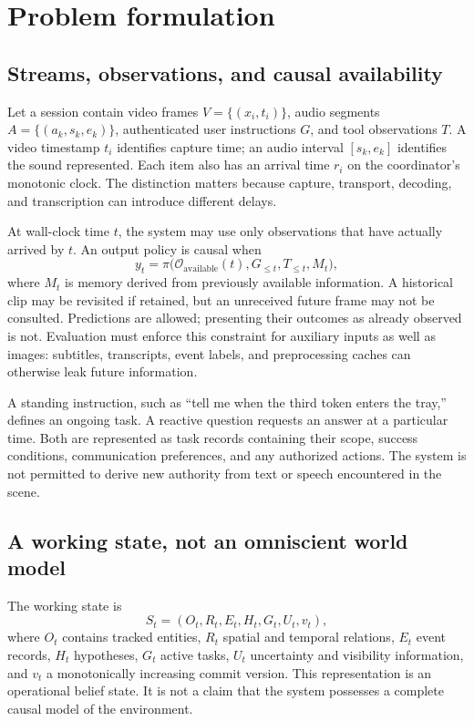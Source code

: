 \documentclass[11pt,letterpaper]{article}
\begin{document}
\section{Problem formulation}
\subsection{Streams, observations, and causal availability}
Let a session contain video frames $V=\{(x_i,t_i)\}$, audio segments $A=\{(a_k,s_k,e_k)\}$, authenticated user instructions $G$, and tool observations $T$. A video timestamp $t_i$ identifies capture time; an audio interval $[s_k,e_k]$ identifies the sound represented. Each item also has an arrival time $r_i$ on the coordinator's monotonic clock. The distinction matters because capture, transport, decoding, and transcription can introduce different delays.

At wall-clock time $t$, the system may use only observations that have actually arrived by $t$. An output policy is causal when
\begin{equation}
 y_t = \pi\bigl(\mathcal{O}_{\mathrm{available}}(t),G_{\leq t},T_{\leq t},M_t\bigr),
 \label{eq:causal}
\end{equation}
where $M_t$ is memory derived from previously available information. A historical clip may be revisited if retained, but an unreceived future frame may not be consulted. Predictions are allowed; presenting their outcomes as already observed is not. Evaluation must enforce this constraint for auxiliary inputs as well as images: subtitles, transcripts, event labels, and preprocessing caches can otherwise leak future information.

A standing instruction, such as ``tell me when the third token enters the tray,'' defines an ongoing task. A reactive question requests an answer at a particular time. Both are represented as task records containing their scope, success conditions, communication preferences, and any authorized actions. The system is not permitted to derive new authority from text or speech encountered in the scene.

\subsection{A working state, not an omniscient world model}
The working state is
\begin{equation}
 S_t=(O_t,R_t,E_t,H_t,G_t,U_t,v_t),
 \label{eq:state}
\end{equation}
where $O_t$ contains tracked entities, $R_t$ spatial and temporal relations, $E_t$ event records, $H_t$ hypotheses, $G_t$ active tasks, $U_t$ uncertainty and visibility information, and $v_t$ a monotonically increasing commit version. This representation is an operational belief state. It is not a claim that the system possesses a complete causal model of the environment.
\end{document}

